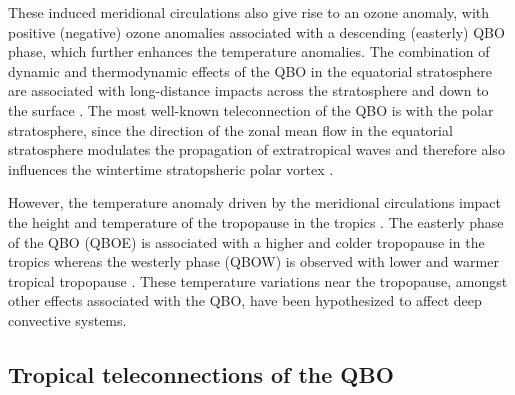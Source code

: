 These induced meridional circulations also give rise to an ozone anomaly, with positive (negative) ozone anomalies associated with a descending  (easterly) QBO phase, which further enhances the temperature anomalies.
The combination of dynamic and thermodynamic effects of the QBO in the equatorial stratosphere are associated with long-distance impacts across the stratosphere \citep{holton1980,lu2020} and down to the surface \citep{garfinkel2010,gray2018}. The most well-known teleconnection of the QBO is with the polar stratosphere, since the direction of the zonal mean flow in the equatorial stratosphere modulates the propagation of extratropical waves and therefore also influences the wintertime stratopsheric polar vortex \citep{lu2020}.

However, the temperature anomaly driven by the meridional circulations impact the height and temperature of the tropopause in the tropics \citep{baldwin2001,tegtmeier2020,tegtmeier2020b}. 
The easterly phase of the QBO (QBOE) is associated with a higher and colder tropopause in the tropics whereas the westerly phase (QBOW) is observed with lower and warmer tropical tropopause \citep{tegtmeier2020}. These temperature variations near the tropopause, amongst other effects associated with the QBO, have been hypothesized to affect deep convective systems.  






\subsection{Tropical teleconnections of the QBO}\label{sq:trop_qbo}




